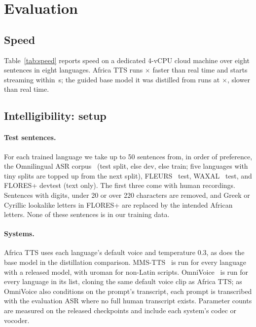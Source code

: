 \documentclass[10pt,twocolumn]{article}
\newcommand{\att}{Africa TTS}
\begin{document}
\section{Evaluation}


\subsection{Speed}
Table~\ref{tab:speed} reports speed on a dedicated 4-vCPU cloud machine over eight sentences in
eight languages. \att{} runs \xrtturbopython{}$\times$ faster than real time and starts
streaming within \ttfaturbopython{}\,s; the guided base model it was distilled from runs at
\xrtfullguidedpython{}$\times$, slower than real time.



\subsection{Intelligibility: setup}
\paragraph{Test sentences.} For each trained language we take up to 50 sentences from, in order
of preference, the Omnilingual ASR corpus~\cite{omniasr2025} (test split, else dev, else
train; five languages with tiny splits are topped up from the next split), FLEURS~\cite{conneau2023fleurs} test, WAXAL~\cite{diack2026waxal} test, and FLORES+
\cite{floresplus,nllb2022} devtest (text only). The first three come with human recordings.
Sentences with digits, under 20 or over 220 characters are removed, and Greek or Cyrillic
lookalike letters in FLORES+ are replaced by the intended African letters. None of these
sentences is in our training data.

\paragraph{Systems.} \att{} uses each language's default voice and temperature 0.3, as does
the base model in the distillation comparison. MMS-TTS~\cite{pratap2023mms} is run for every language
with a released model, with uroman for non-Latin scripts. OmniVoice~\cite{zhu2026omnivoice}
is run for every language in its list, cloning the same default voice clip as \att{}; as
OmniVoice also conditions on the prompt's transcript, each prompt is transcribed with the
evaluation ASR where no full human transcript exists. Parameter counts are measured on the
released checkpoints and include each system's codec or vocoder.
\end{document}
